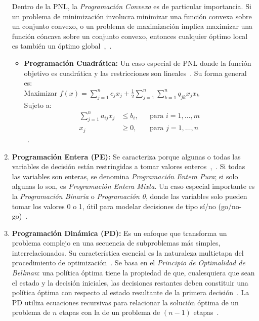 \begin{enumerate}[label=\arabic*.]
    Dentro de la PNL, la \textit{Programación Convexa} es de particular importancia. Si un problema de minimización involucra minimizar una función convexa sobre un conjunto convexo, o un problema de maximización implica maximizar una función cóncava sobre un conjunto convexo, entonces cualquier óptimo local es también un óptimo global~\cite[p.~418]{nocedal2006},~\cite[p.~1]{boyd2004}.
    \begin{itemize}
        \item \textbf{Programación Cuadrática:} Un caso especial de PNL donde la función objetivo es cuadrática y las restricciones son lineales~\cite[p.~419]{nocedal2006}. Su forma general es: \\
        Maximizar $f(x) = \sum_{j=1}^{n} c_j x_j + \frac{1}{2} \sum_{j=1}^{n} \sum_{k=1}^{n} q_{jk} x_j x_k$ \\
        Sujeto a:
        \begin{align*}
            \sum_{j=1}^{n} a_{ij} x_j & \leq b_i, && \text{para } i = 1, \ldots, m \\
            x_j & \geq 0, && \text{para } j = 1, \ldots, n
        \end{align*}~\cite[p.~433]{nocedal2006}.
    \end{itemize}

    \item \textbf{Programación Entera (PE):}
    Se caracteriza porque algunas o todas las variables de decisión están restringidas a tomar valores enteros~\cite[p.~9]{sinha2006},~\cite[p.~272]{bradley1977pe}. Si todas las variables son enteras, se denomina \textit{Programación Entera Pura}; si solo algunas lo son, es \textit{Programación Entera Mixta}. Un caso especial importante es la \textit{Programación Binaria} o \textit{Programación 0}, donde las variables solo pueden tomar los valores 0 o 1, útil para modelar decisiones de tipo sí/no (go/no-go)~\cite[p.~273]{bradley1977pe}. \\

    \item \textbf{Programación Dinámica (PD):}
    Es un enfoque que transforma un problema complejo en una secuencia de subproblemas más simples, interrelacionados. Su característica esencial es la naturaleza multietapa del procedimiento de optimización~\cite[p.~320]{bradley1977pd}. Se basa en el \textit{Principio de Optimalidad de Bellman}: una política óptima tiene la propiedad de que, cualesquiera que sean el estado y la decisión iniciales, las decisiones restantes deben constituir una política óptima con respecto al estado resultante de la primera decisión~\cite[p.~323]{bradley1977pd}. La PD utiliza ecuaciones recursivas para relacionar la solución óptima de un problema de $n$ etapas con la de un problema de $(n-1)$ etapas~\cite[p.~325]{bradley1977pd}.


\end{enumerate}
